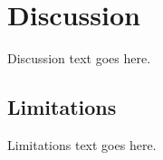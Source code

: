 \section{Discussion}
\label{sec:discussion}


Discussion text goes here.

\subsection{Limitations}
\label{sec:limitations}


Limitations text goes here.
